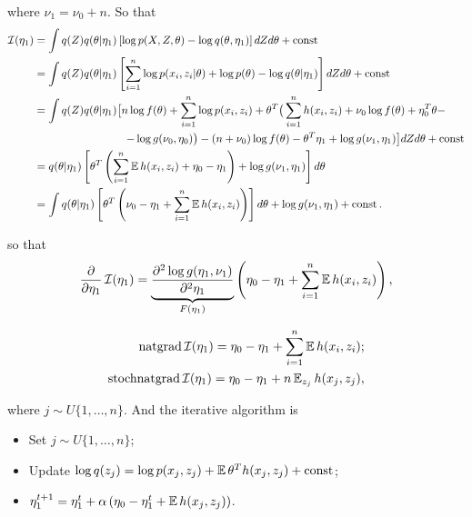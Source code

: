 where $\nu_1 = \nu_0 + n$. So that
\begin{equation*}
    \begin{aligned}
        \operatorname{\mathcal{I}}(\eta_1) &= \int q(Z) q(\theta | \eta_1) \left[\log p(X, Z, \theta) - \log q(\theta, \eta_1) \right] dZ d\theta + \operatorname{const} \\
        &= \int q(Z) q(\theta | \eta_1) \left[ \sum_{i = 1}^n \log p(x_i, z_i | \theta) + \log p(\theta) - \log q(\theta | \eta_1) \right] dZ d\theta + \operatorname{const} \\
        &= \int q(Z) q(\theta | \eta_1) \big[ n \log f(\theta) + \sum_{i = 1}^n \log p(x_i, z_i) + \theta^T \big( \sum_{i = 1}^n h(x_i, z_i) + \nu_0 \log f(\theta) + \eta_0^T \theta -\\
        &\operatorname{\qquad \qquad \qquad \qquad} - \log g(\nu_0, \eta_0)\big) - (n + \nu_0) \log f(\theta) - \theta^T \eta_1 + \log g(\nu_1, \eta_1)\big] dZ d\theta + \operatorname{const} \\
        &= q(\theta | \eta_1) \left[ \theta^T \left( \sum_{i = 1}^n \operatorname{\mathbb{E}} h(x_i, z_i) + \eta_0 - \eta_1\right) + \log g(\nu_1, \eta_1)\right] d \theta \\
        &= \int q(\theta | \eta_1) \left[ \theta^T \left( \nu_0 - \eta_1 + \sum_{i = 1}^n \operatorname{\mathbb{E}} h(x_i, z_i)\right)\right] d \theta + \log g(\nu_1, \eta_1) + \operatorname{const}.
    \end{aligned}
\end{equation*}

so that
\begin{equation*}
    \frac{\partial}{\partial \eta_1} \operatorname{\mathcal{I}}(\eta_1) = \underbrace{\frac{\partial^2 \log g(\eta_1, \nu_1)}{\partial^2 \eta_1}}_{F(\eta_1)} \left(\eta_0 - \eta_1 + \sum_{i = 1}^n \operatorname{\mathbb{E}} h(x_i, z_i) \right),
\end{equation*}

\begin{equation*}
    \begin{aligned}
        \operatorname{natgrad} \operatorname{\mathcal{I}}(\eta_1) = \eta_0 - \eta_1 + \sum_{i = 1}^n \operatorname{\mathbb{E}} h(x_i, z_i); \\
        \operatorname{stochnatgrad} \operatorname{\mathcal{I}}(\eta_1) = \eta_0 - \eta_1 + n \operatorname{\mathbb{E}}_{z_j} h(x_j, z_j),
    \end{aligned}
\end{equation*}

where $j \sim U\{1, \ldots, n\}$. And the iterative algorithm is
\begin{itemize}
    \item Set $j \sim U\{1, \ldots, n\}$;
    \item Update $\log q(z_j) = \log p(x_j, z_j) + \operatorname{\mathbb{E}} \theta^T h(x_j, z_j) + \operatorname{const}$;
    \item $\eta_1^{t+1} = \eta_1^t + \alpha \left( \eta_0 - \eta_1^t + \operatorname{\mathbb{E}} h(x_j, z_j) \right)$.
\end{itemize}

